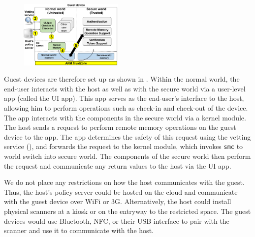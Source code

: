 \begin{figure}[t!]
\centering
\includegraphics[keepaspectratio=true,width=0.45\textwidth]{figures/overall-design.png}
\indent\vspace{-0.4cm}
\indent\vspace{-0.55cm}
\end{figure}

Guest devices are therefore set up as shown in .  Within
the normal world, the end-user interacts with the host as well as with the
secure world via a user-level app (called the UI app).  This app serves as the
end-user's interface to the host, allowing him to perform operations such as
check-in and check-out of the device. The app interacts with the components in
the secure world via a kernel module. The host sends a request to perform
remote memory operations on the guest device to the app. The app determines the
safety of this request using the vetting service (),
and forwards the request to the kernel module, which invokes \texttt{smc} to
world switch into secure world. The components of the secure world then perform
the request and communicate any return values to the host via the UI app. 

We do not place any restrictions on how the host communicates with the guest.
Thus, the host's policy server could be hosted on the cloud and communicate
with the guest device over WiFi or 3G. Alternatively, the host could install
physical scanners at a kiosk or on the entryway to the restricted space.  The
guest devices would use Bluetooth, NFC, or their USB interface to pair with the
scanner and use it to communicate with the host.

